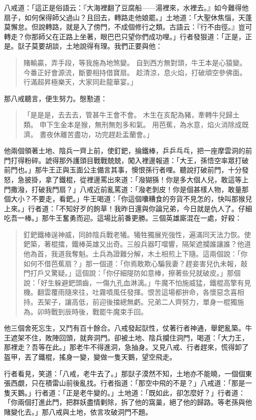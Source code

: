 八戒道：「這正是俗語云：『大海裡翻了豆腐船——湯裡來，水裡去。』如今難得他扇子，如何保得師父過山？且回去，轉路走他娘罷。」土地道：「大聖休焦惱，天蓬莫懈怠。但說轉路，就是入了傍門，不成個修行之類。古語云：『行不由徑。』豈可轉走？你那師父在正路上坐著，眼巴巴只望你們成功哩。」行者發狠道：「正是，正是。獃子莫要胡談，土地說得有理。我們正要與他：
\begin{quote}
賭輸贏，弄手段，等我施為地煞變。
自到西方無對頭，牛王本是心猿變。
今番正好會源流，斷要相持借寶扇。
趁清涼，息火焰，打破頑空參佛面。
行滿超昇極樂天，大家同赴龍華宴。」
\end{quote}

那八戒聽言，便生努力。慇懃道：
\begin{quote}
「是是是，去去去，管甚牛王會不會。
木生在亥配為豬，牽轉牛兒歸土類。
申下生金本是猴，無刑無剋多和氣。
用芭蕉，為水意，焰火消除成既濟。
晝夜休離苦盡功，功完趕赴盂蘭會。」
\end{quote}

他兩個領著土地、陰兵一齊上前，使釘鈀，掄鐵棒，乒乒乓乓，把一座摩雲洞的前門打得粉碎。諕得那外護頭目戰戰兢兢，闖入裡邊報道：「大王，孫悟空率眾打破前門也。」那牛王正與玉面公主備言其事，懊恨孫行者哩。聽說打破前門，十分發怒，急披掛，拿了鐵棍，從裡邊罵出來道：「潑猢猻！你是多大個人兒，敢這等上門撒潑，打破我門扇？」八戒近前亂罵道：「潑老剝皮！你是個甚樣人物，敢量那個大小？不要走，看鈀。」牛王喝道：「你這個囔糟食的夯貨不見怎的，快叫那猴兒上來。」行者道：「不知好歹的䬲草！我昨日還與你論兄弟，今日就是仇人了。仔細吃吾一棒。」那牛王奮勇而迎。這場比前番更勝。三個英雄廝混在一處，好殺：
\begin{quote}
釘鈀鐵棒逞神威，同帥陰兵戰老犧。犧牲獨展兇強性，遍滿同天法力恢。使鈀築，著棍擂，鐵棒英雄又出奇。三般兵器叮噹響，隔架遮攔誰讓誰？他道他為首，我道我奪魁。土兵為證難分解，木土相煎上下隨。這兩個說：「你如何不借芭蕉扇？」那一個道：「你焉敢欺心騙我妻？趕妾害兒仇未報，敲門打戶又驚疑。」這個說：「你仔細隄防如意棒，擦著些兒就破皮。」那個說：「好生躲避鈀頭齒，一傷九孔血淋漓。」牛魔不怕施威猛，鐵棍高擎有見機。翻雲覆雨隨來往，吐霧噴風任發揮。恨苦這場都拚命，各懷惡念喜相持。丟架子，讓高低，前迎後擋總無虧。兄弟二人齊努力，單身一棍獨施為。卯時戰到辰時後，戰罷牛魔束手回。
\end{quote}

他三個舍死忘生，又鬥有百十餘合。八戒發起獃性，仗著行者神通，舉鈀亂築。牛王遮架不住，敗陣回頭，就奔洞門。卻被土地、陰兵攔住洞門，喝道：「大力王，那裡走？吾等在此。」那老牛不得進洞，急抽身。又見八戒、行者趕來，慌得卸了盔甲，丟了鐵棍，搖身一變，變做一隻天鵝，望空飛走。

行者看見，笑道：「八戒，老牛去了。」那獃子漠然不知，土地亦不能曉，一個個東張西覷，只在積雷山前後亂找。行者指道：「那空中飛的不是？」八戒道：「那是一隻天鵝。」行者道：「正是老牛變的。」土地道：「既如此，卻怎麼好？」行者道：「你兩個打進此門，把群妖盡情剿除，拆了他的窩巢，絕了他的歸路。等老孫與他賭變化去。」那八戒與土地，依言攻破洞門不題。

